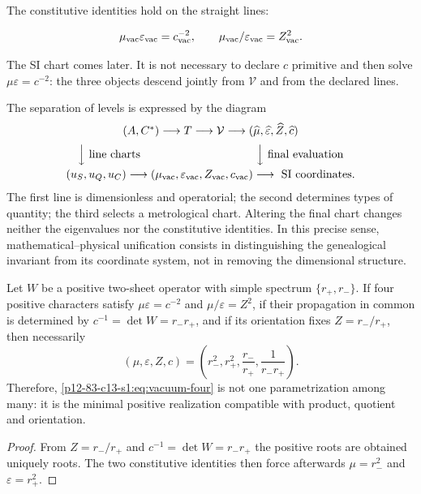 The constitutive identities hold on the straight lines:

\begin{equation}
\mu_{\rm vac}\varepsilon_{\rm vac}=c_{\rm vac}^{-2},
\qquad
\mu_{\rm vac}/\varepsilon_{\rm vac}=Z_{\rm vac}^2.
\end{equation}

The SI chart comes later. It is not necessary to declare \(c\) primitive and then solve \(\mu\varepsilon=c^{-2}\): the three objects descend jointly from \(\mathcal V\) and from the declared lines.

The separation of levels is expressed by the diagram
\[
\begin{array}{c}
(A,C^*)\longrightarrow T\longrightarrow\mathcal V
\longrightarrow
(\widehat\mu,\widehat\varepsilon,\widehat Z,\widehat c)
\\[2mm]
\Big\downarrow\text{ line charts}\hspace{36mm}
\Big\downarrow\text{ final evaluation}
\\[2mm]
(u_S,u_Q,u_C)\longrightarrow
(\mu_{\rm vac},\varepsilon_{\rm vac},Z_{\rm vac},c_{\rm vac})
\longrightarrow\text{ SI coordinates}.
\end{array}
\]
The first line is dimensionless and operatorial; the second determines types of
quantity; the third selects a metrological chart. Altering the final chart
changes neither the eigenvalues nor the constitutive identities. In this
precise sense, mathematical--physical unification consists in distinguishing
the genealogical invariant from its coordinate system, not in removing the
dimensional structure.

\begin{proposition}
Let \(W\) be a positive two-sheet operator with simple spectrum
\(\{r_+,r_-\}\). If four positive characters satisfy
\(\mu\varepsilon=c^{-2}\) and \(\mu/\varepsilon=Z^2\), if their propagation in common is determined by \(c^{-1}=\det W=r_-r_+\), and if its orientation
fixes \(Z=r_-/r_+\), then necessarily
\[
(\mu,\varepsilon,Z,c)
=\left(r_-^2,r_+^2,\frac{r_-}{r_+},\frac1{r_-r_+}\right).
\]
Therefore, \cref{p12-83-c13-s1:eq:vacuum-four} is not one parametrization among many:
it is the minimal positive realization compatible with product, quotient and
orientation.
\end{proposition}

\begin{proof}
From \(Z=r_-/r_+\) and \(c^{-1}=\det W=r_-r_+\) the positive roots are obtained uniquely
roots. The two constitutive identities then force afterwards
\(\mu=r_-^2\) and \(\varepsilon=r_+^2\).
\end{proof}

